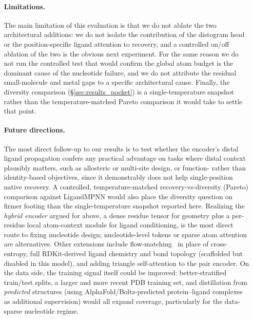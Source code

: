 \documentclass[11pt,letterpaper]{article}
\begin{document}
\paragraph{Limitations.}
The main limitation of this evaluation is that we do not ablate the two architectural additions: we do
not isolate the contribution of the distogram head or the position-specific ligand attention to
recovery, and a controlled on/off ablation of the two is the obvious next experiment. For the same
reason we do not run the controlled test that would confirm the global atom budget is the dominant
cause of the nucleotide failure, and we do not attribute the residual small-molecule and metal gaps to
a specific architectural cause. Finally, the diversity comparison (\S\ref{sec:results_pocket}) is a
single-temperature snapshot rather than the temperature-matched Pareto comparison it would take to
settle that point.

\paragraph{Future directions.}
The most direct follow-up to our results is to test whether the encoder's distal ligand propagation
confers any practical advantage on tasks where distal context plausibly matters, such as allosteric or
multi-site design, or function- rather than identity-based objectives, since it demonstrably does not
help single-position native recovery. A controlled, temperature-matched recovery-vs-diversity (Pareto)
comparison against LigandMPNN would also place the diversity question on firmer footing than the
single-temperature snapshot reported here. Realizing the \emph{hybrid encoder} argued for above, a dense residue tensor for geometry plus a per-residue local atom-context
module for ligand conditioning, is the most direct route to fixing nucleotide design; nucleotide-level
tokens or sparse atom attention are alternatives. Other
extensions include flow-matching~\citep{lipman2022flowmatching} in place of cross-entropy, full RDKit-derived
ligand chemistry and bond topology (scaffolded but disabled in this model), and adding triangle
self-attention to the pair encoder. On the data side, the training signal itself could be improved:
better-stratified train/test splits, a larger and more recent PDB training set, and distillation from
\emph{predicted} structures (using AlphaFold/Boltz-predicted protein--ligand complexes as additional
supervision) would all expand coverage, particularly for the data-sparse nucleotide regime.
\end{document}
